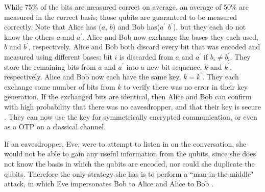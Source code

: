 While 75\% of the bits are measured correct on average, an average of 50\% are measured in the correct basis; those qubits are  guaranteed to be measured correctly.
Note that Alice has ($a$, $b$) and Bob has($a^\prime$ $b^\prime$), but they each do not know the others $a$ and $a^\prime$.
Alice and Bob now exchange the bases they each used, $b$ and $b^\prime$, respectively.
Alice and Bob both discard every bit that was encoded and measured using different bases: bit $i$ is discarded from $a$ and $a^\prime$ if $b_i \neq b^\prime_i$.
They store the remaining bits from $a$ and $a^\prime$ into a new bit sequence, $k$ and $k^\prime$, respectively.
Alice and Bob now each have the same key, $k = k^\prime$.
They each exchange some number of bits from $k$ to verify there was no error in their key generation.
If the exchanged bits are identical, then Alice and Bob can confirm with high probability that there was no eavesdropper, and that their key is secure \cite{MikeAndIke}.
They can now use the key for symmetrically encrypted communication, or even as a OTP on a classical channel.

If an eavesdropper, Eve, were to attempt to listen in on the conversation, she would not be able to gain any useful information from the qubits, since she does not know the basis in which the qubits are encoded, nor could she duplicate the qubits. 
Therefore the only strategy she has is to perform a ``man-in-the-middle" attack, in which Eve impersonates Bob to Alice and Alice to Bob \cite{qc:agi}.

